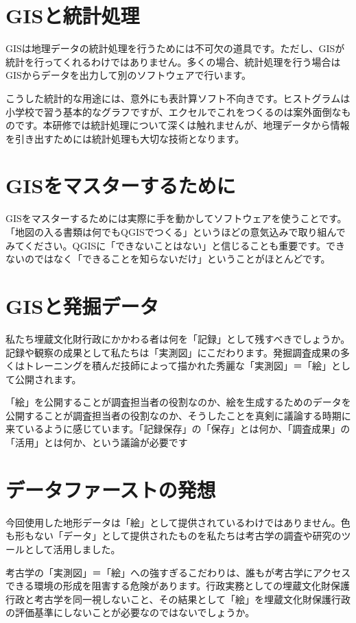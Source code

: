 \documentclass[14Q,twocolumn]{jsarticle}
\begin{document}
\section{GISと統計処理}
GISは地理データの統計処理を行うためには不可欠の道具です。ただし、GISが統計を行ってくれるわけではありません。多くの場合、統計処理を行う場合はGISからデータを出力して別のソフトウェアで行います。

こうした統計的な用途には、意外にも表計算ソフト不向きです。ヒストグラムは小学校で習う基本的なグラフですが、エクセルでこれをつくるのは案外面倒なものです。本研修では統計処理について深くは触れませんが、地理データから情報を引き出すためには統計処理も大切な技術となります。

\section{GISをマスターするために}
GISをマスターするためには実際に手を動かしてソフトウェアを使うことです。「地図の入る書類は何でもQGISでつくる」というほどの意気込みで取り組んでみてください。QGISに「できないことはない」と信じることも重要です。できないのではなく「できることを知らないだけ」ということがほとんどです。

\section{GISと発掘データ}
私たち埋蔵文化財行政にかかわる者は何を「記録」として残すべきでしょうか。記録や観察の成果として私たちは「実測図」にこだわります。発掘調査成果の多くはトレーニングを積んだ技師によって描かれた秀麗な「実測図」＝「絵」として公開されます。

「絵」を公開することが調査担当者の役割なのか、絵を生成するためのデータを公開することが調査担当者の役割なのか、そうしたことを真剣に議論する時期に来ているように感じています。「記録保存」の「保存」とは何か、「調査成果」の「活用」とは何か、という議論が必要です

\section{データファーストの発想}
今回使用した地形データは「絵」として提供されているわけではありません。色も形もない「データ」として提供されたものを私たちは考古学の調査や研究のツールとして活用しました。

考古学の「実測図」＝「絵」への強すぎるこだわりは、誰もが考古学にアクセスできる環境の形成を阻害する危険があります。行政実務としての埋蔵文化財保護行政と考古学を同一視しないこと、その結果として「絵」を埋蔵文化財保護行政の評価基準にしないことが必要なのではないでしょうか。

\end{document}
